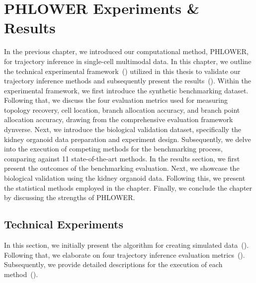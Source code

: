 \chapter{PHLOWER Experiments \& Results}
\label{chapter:PHLOWER_bench}
\graphicspath{{chapter6/figs}}


In the previous chapter, we introduced our computational method, PHLOWER, for trajectory inference in single-cell multimodal data. In this chapter, we outline the technical experimental framework~() utilized in this thesis to validate our trajectory inference methods and subsequently present the results~(). Within the experimental framework, we first introduce the synthetic benchmarking dataset. Following that, we discuss the four evaluation metrics used for measuring topology recovery, cell location, branch allocation accuracy, and branch point allocation accuracy, drawing from the comprehensive evaluation framework dynverse. Next, we introduce the biological validation dataset, specifically the kidney organoid data preparation and experiment design. Subsequently, we delve into the execution of competing methods for the benchmarking process, comparing against 11 state-of-the-art methods. In the results section, we first present the outcomes of the benchmarking evaluation. Next, we showcase the biological validation using the kidney organoid data. Following this, we present the statistical methods employed in the chapter. Finally, we conclude the chapter by discussing the strengths of PHLOWER.



\section{Technical Experiments}
\label{chapter:PHLOWER_bench:tech_exp}
In this section, we initially present the algorithm for creating simulated data~(). Following that, we elaborate on four trajectory inference evaluation metrics~(). Subsequently, we provide detailed descriptions for the execution of each method~().

